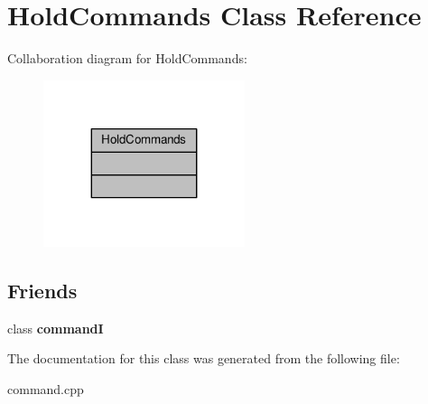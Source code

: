 \hypertarget{classHoldCommands}{}\section{Hold\+Commands Class Reference}
\label{classHoldCommands}


Collaboration diagram for Hold\+Commands\+:
\nopagebreak
\begin{figure}[H]
\begin{center}
\leavevmode
\includegraphics[width=167pt]{d4/deb/classHoldCommands__coll__graph}
\end{center}
\end{figure}
\subsection*{Friends}
\begin{DoxyCompactItemize}
\item 
class {\bfseries commandI}\hypertarget{classHoldCommands_a63824fb3323101bef5befca528f5230c}{}\label{classHoldCommands_a63824fb3323101bef5befca528f5230c}

\end{DoxyCompactItemize}


The documentation for this class was generated from the following file\+:\begin{DoxyCompactItemize}
\item 
command.\+cpp\end{DoxyCompactItemize}
